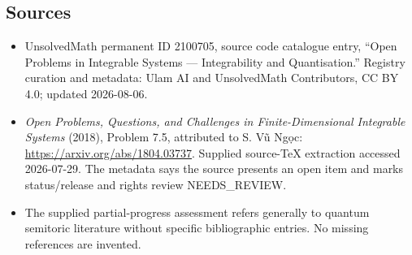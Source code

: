 \documentclass[11pt]{article}
\begin{document}
\subsection{Sources}
\begin{itemize}
\item UnsolvedMath permanent ID 2100705, source code catalogue entry, ``Open Problems in Integrable Systems --- Integrability and Quantisation.'' Registry curation and metadata: Ulam AI and UnsolvedMath Contributors, CC BY 4.0; updated 2026-08-06.
\item \emph{Open Problems, Questions, and Challenges in Finite-Dimensional Integrable Systems} (2018), Problem 7.5, attributed to S. Vũ Ngọc: \url{https://arxiv.org/abs/1804.03737}. Supplied source-TeX extraction accessed 2026-07-29. The metadata says the source presents an open item and marks status/release and rights review NEEDS\_REVIEW.
\item The supplied partial-progress assessment refers generally to quantum semitoric literature without specific bibliographic entries. No missing references are invented.
\end{itemize}
\end{document}
